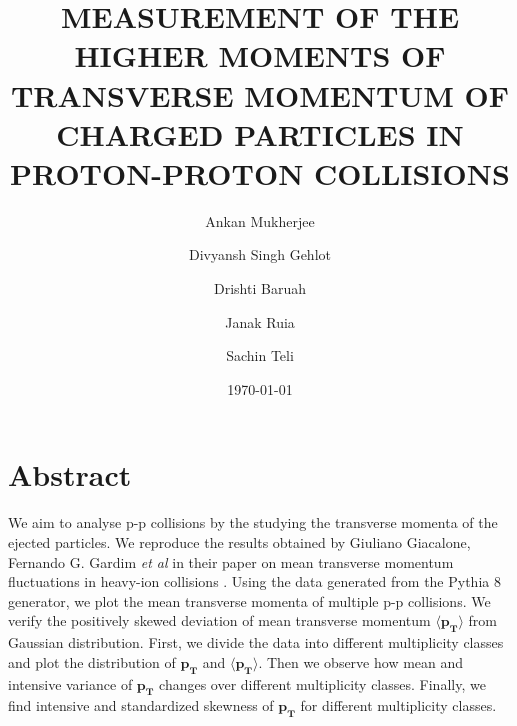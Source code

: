 \documentclass[letterpaper,aps,prc,superscriptaddress,nofootinbib,10pt,showpacs,floatfix]{revtex4-2}%
\begin{document}
\title{MEASUREMENT OF THE HIGHER MOMENTS OF TRANSVERSE MOMENTUM OF CHARGED PARTICLES IN PROTON-PROTON COLLISIONS}
\author{Ankan Mukherjee} 
\author{Divyansh Singh Gehlot}
\author{Drishti Baruah}
\author{Janak Ruia}
\author{Sachin Teli}




\date{\today}  



\maketitle
\vspace{-10mm}
\section*{Abstract}
\vspace{-2mm}
\begin{adjustwidth}{20pt}{20pt}
We aim to analyse p-p collisions by the studying the transverse momenta of the ejected particles. We reproduce the results obtained by Giuliano Giacalone, Fernando G. Gardim {\it et al} in their paper on mean transverse momentum fluctuations in heavy-ion collisions \cite{fluct}. Using the data generated from the Pythia 8 generator, we plot the mean transverse momenta of multiple p-p collisions. We verify the positively skewed deviation of mean transverse momentum $\mathbf{\langle p_T \rangle}$  from Gaussian distribution. First, we divide the data into different multiplicity classes and plot the distribution of $\mathbf{p_T}$ and $\mathbf{\langle  p_T\rangle}$. Then we observe how mean and intensive variance of $\mathbf{p_T}$ changes over different multiplicity classes. Finally, we find intensive and standardized skewness of $\mathbf{p_T}$ for different multiplicity classes. 
\end{adjustwidth}


\vspace{-2mm}
\end{document}

